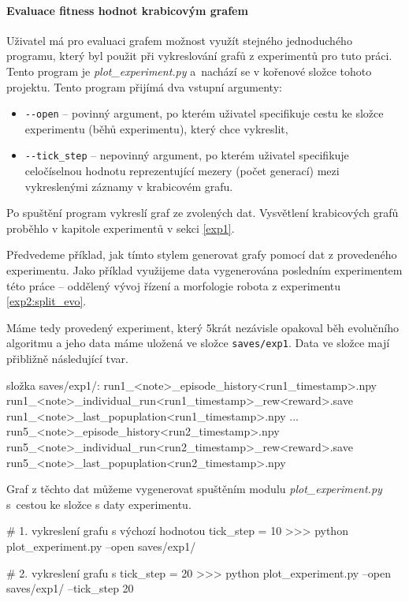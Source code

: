 \paragraph{Evaluace fitness hodnot krabicovým grafem}
Uživatel má pro evaluaci grafem možnost využít stejného jednoduchého programu,
který byl použit při vykreslování grafů z experimentů pro tuto práci. Tento
program je \emph{plot\_experiment.py} a~nachází se v kořenové složce
tohoto projektu. Tento program přijímá dva vstupní argumenty: 
\begin{itemize}
    \item \texttt{-{}-open} -- povinný argument, po kterém uživatel specifikuje
        cestu ke složce experimentu (běhů experimentu), který chce vykreslit,
    \item \texttt{-{}-tick\_step} -- nepovinný argument, po kterém uživatel specifikuje
        celočíselnou hodnotu reprezentující mezery (počet generací) mezi
        vykreslenými záznamy v krabicovém grafu.
\end{itemize}
Po spuštění program vykreslí graf ze zvolených dat. Vysvětlení krabicových
grafů proběhlo v kapitole experimentů v sekci \ref{exp1}.

Předvedeme příklad, jak tímto stylem generovat grafy pomocí dat z provedeného
experimentu. Jako příklad využijeme data vygenerována posledním experimentem
této práce -- oddělený vývoj řízení a morfologie robota z experimentu
\ref{exp2:split_evo}. 

Máme tedy provedený experiment, který 5krát nezávisle opakoval běh evolučního
algoritmu a jeho data máme uložená ve složce \texttt{saves/exp1}. Data ve
složce mají přibližně následující tvar.
\begin{code}
složka saves/exp1/:
    run1_<note>_episode_history<run1_timestamp>.npy
    run1_<note>_individual_run<run1_timestamp>_rew<reward>.save
    run1_<note>_last_popuplation<run1_timestamp>.npy
    ...
    run5_<note>_episode_history<run2_timestamp>.npy
    run5_<note>_individual_run<run2_timestamp>_rew<reward>.save
    run5_<note>_last_popuplation<run2_timestamp>.npy
\end{code}
Graf z těchto dat můžeme vygenerovat spuštěním modulu
\emph{plot\_experiment.py} s~cestou ke složce s daty experimentu.

\begin{code}
# 1. vykreslení grafu s výchozí hodnotou tick_step = 10
>>> python plot_experiment.py --open saves/exp1/ 

# 2. vykreslení grafu s tick_step = 20
>>> python plot_experiment.py --open saves/exp1/ --tick_step 20
\end{code}

